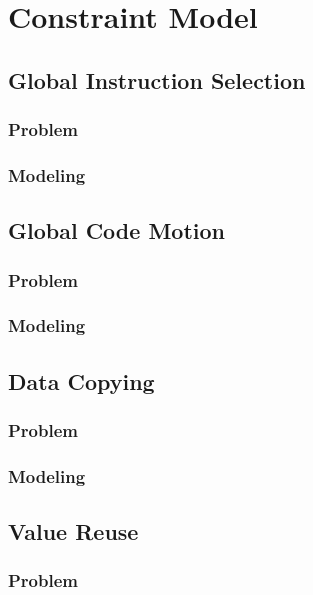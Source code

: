 %

\chapter{Constraint Model}

\section{Global Instruction Selection}
\subsection{Problem}
\subsection{Modeling}

\section{Global Code Motion}
\subsection{Problem}
\subsection{Modeling}

\section{Data Copying}
\subsection{Problem}
\subsection{Modeling}

\section{Value Reuse}
\subsection{Problem}
